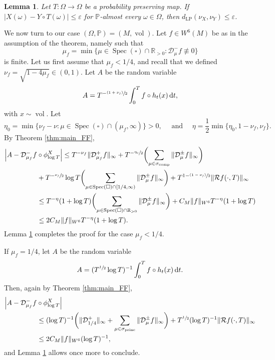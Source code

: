 \documentclass[JEP,XML,SOM,NoEqCountersInSection,Unicode,published]{cedram}
\newcommand{\psfrac}[2]{\sfrac{(#1)}{#2}}
\newcommand \R{\mathbb{R}}
\newcommand*{\diff}{\mathop{}\!\mathrm{d}}
\newcommand{\Dm}[1]{\mathcal{D}_\mu^{-} #1}
\newcommand{\Dpm}[1]{\mathcal{D}_\mu^{\pm} #1}
\newcommand{\Levy}{d_{\levyy}}
\DeclareMathOperator{\vol}{vol}
\DeclareMathOperator{\Spec}{Spec}
\DeclareMathOperator{\comp}{comp}
\DeclareMathOperator{\princ}{princ}
\DeclareMathOperator{\levyy}{LP}
\newtheorem {lemma}[theorem]{Lemma}
\theoremstyle{definition}
\begin{document}
\begin{lemma}\label{lemma:levy}
Let $T \colon \Omega \to \Omega$ be a probability preserving map. If $|X(\omega) - Y\circ T(\omega)|\leq \varepsilon$ for $\mathbb{P}$-almost every $\omega \in \Omega$, then $\Levy(\nu_X, \nu_Y) \leq \varepsilon$.
\end{lemma}

We now turn to our case $(\Omega, \mathbb{P}) = (M, \vol)$.
Let $f \in W^6(M)$ be as in the assumption of the theorem, namely such that
\[
\mu_f = \min \{ \mu \in \Spec(\square) \cap \R_{>0} : \Dm{f} \not\equiv 0 \}
\]
is finite.
Let us first assume that $\mu_f <1/4$, and recall that we defined $\nu_f = \sqrt{1-4\mu_f} \in (0,1)$. Let $A$ be the random variable
\[
A = T^{-\psfrac{1+\nu_f}{2}} \int_0^T f \circ h_t(x) \diff t,
\]
with $x \sim \vol$.
Let
\[
\eta_0 = \min\{ \nu_f - \nu : \mu \in \Spec(\square) \cap (\mu_f, \infty) \} >0, \quad \text{ and } \quad \eta= \frac{1}{2} \min\{\eta_0, 1-\nu_f, \nu_f\}.
\]
By Theorem \ref{thm:main_FF},
\begin{align*}
\Bigl\lvert A - \mathcal{D}^{-}_{\mu_f} f&\circ \phi^X_{\log T} \Bigr\rvert \leq T^{- \nu_f} \|\mathcal{D}^{+}_{\mu_f} f\|_{\infty} + T^{- \sfrac{\eta_0}{2}} \biggl(\sum_{\mu \in \sigma_{\comp}} \|\Dpm{f} \|_{\infty} \biggr) \\
& + T^{- \sfrac{\nu_f}{2}} \log T \biggl(\sum_{\mu \in \Spec(\square) \cap [1/4, \infty)} \|\Dpm{f} \|_{\infty} \biggr) + T^{1-\psfrac{1-\nu_f}{2}} \|\mathcal{R}f(\cdot, T) \|_{\infty} \\
&\leq T^{-\eta} (1+\log T) \biggl(\sum_{\mu \in \Spec(\square) \cap \R_{>0}} \|\Dpm{f} \|_{\infty} \biggr) + C_M \|f\|_{W^6} T^{-\eta}(1+\log T)\\
&\leq 2C_M \|f\|_{W^6} T^{-\eta}(1+\log T).
\end{align*}
Lemma \ref{lemma:levy} completes the proof for the case $\mu_f < 1/4$.

If $\mu_f = 1/4$, let $A$ be the random variable
\[
A = (T^{\sfrac{1}{2}} \log T)^{-1} \int_0^T f \circ h_t(x) \diff t.
\]
Then, again by Theorem \ref{thm:main_FF},
\begin{align*}
\Bigl\lvert A - \mathcal{D}^{-}_{\mu_f} f &\circ \phi^X_{\log T} \Bigr\rvert\\
&\leq (\log T)^{-1} \biggl(\|\mathcal{D}^{+}_{1/4} \|_{\infty} + \sum_{\mu \in \sigma_{\princ}} \|\Dpm{f} \|_{\infty} \biggr) + T^{\sfrac{1}{2}} (\log T)^{-1} \|\mathcal{R}f(\cdot, T) \|_{\infty} \\
& \leq 2C_M \|f\|_{W^6} (\log T)^{-1},
\end{align*}
and Lemma \ref{lemma:levy} allows once more to conclude.
\end{document}
